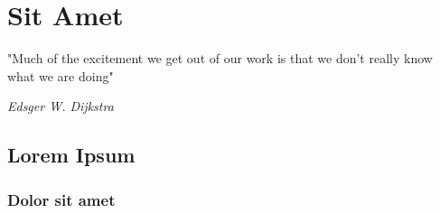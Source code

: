 \chapter{Sit Amet}\label{chap:sit}

\epigraph{"Much of the excitement we get out of our work is that we don't really know what we are doing"}{\textit{Edsger W. Dijkstra}}

\lipsum[1]

\section{Lorem Ipsum}
\lipsum[2-4]

\subsection{Dolor sit amet}
\lipsum[5-7]